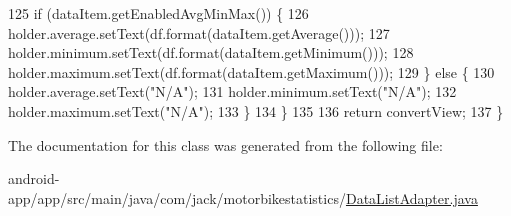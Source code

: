 \begin{DoxyCode}
125             \textcolor{keywordflow}{if} (dataItem.getEnabledAvgMinMax()) \{
126                 holder.average.setText(df.format(dataItem.getAverage()));
127                 holder.minimum.setText(df.format(dataItem.getMinimum()));
128                 holder.maximum.setText(df.format(dataItem.getMaximum()));
129             \} \textcolor{keywordflow}{else} \{
130                 holder.average.setText(\textcolor{stringliteral}{"N/A"});
131                 holder.minimum.setText(\textcolor{stringliteral}{"N/A"});
132                 holder.maximum.setText(\textcolor{stringliteral}{"N/A"});
133             \}
134         \}
135 
136         \textcolor{keywordflow}{return} convertView;
137     \}
\end{DoxyCode}


The documentation for this class was generated from the following file\+:\begin{DoxyCompactItemize}
\item 
android-\/app/app/src/main/java/com/jack/motorbikestatistics/\hyperlink{_data_list_adapter_8java}{Data\+List\+Adapter.\+java}\end{DoxyCompactItemize}

